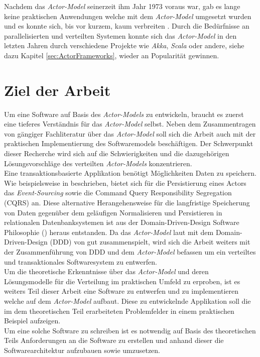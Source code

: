 % 
Nachdem das \textit{Actor-Model} seinerzeit ihm Jahr 1973 voraus war, gab es lange keine praktischen Anwendungen welche mit dem \textit{Actor-Model} umgesetzt wurden und es konnte sich, bis vor kurzem, kaum verbreiten \citep{mackay1997has}. Durch die Bedürfnisse an parallelisierten und verteilten Systemen konnte sich das \textit{Actor-Model} in den letzten Jahren durch verschiedene Projekte wie \textit{Akka}, \textit{Scala} oder andere, siehe dazu Kapitel \ref{sec:ActorFrameworks}, wieder an Popularität gewinnen. 
% 
% 

\section{Ziel der Arbeit}\label{sec:introduction:workGoal}
Um eine Software auf Basis des \textit{Actor-Models} zu entwickeln, braucht es zuerst eine tieferes Verständnis für das \textit{Actor-Model}  selbst.  Neben dem Zusammentragen  von gängiger Fachliteratur über das \textit{Actor-Model} soll sich die Arbeit auch mit der praktischen Implementierung des Softwaremodels beschäftigen. Der Schwerpunkt dieser Recherche wird sich auf die Schwierigkeiten und die dazugehörigen Lösungsvorschläge des verteilten \textit{Actor-Models}  konzentrieren. \\
Eine transaktionsbasierte Applikation benötigt Möglichkeiten Daten zu speichern. Wie beispielsweise in \cite{Vernon2015ReactiveAkka} beschrieben, bietet sich für die Persistierung eines Actors das \textit{Event-Sourcing} sowie die {Command Query Responsibility Segregation (CQRS)} an. Diese alternative Herangehensweise für die langfristige Speicherung von Daten gegenüber dem geläufigen Normalisieren und Persistieren in relationalen Datenbanksystemen ist aus der Domain-Driven-Design Software Philosophie (\cite{Evans2004Domain-drivenSoftware}) heraus  entstanden. Da das \textit{Actor-Model} laut \cite{Vernon2015ReactiveAkka} mit dem {Domain-Driven-Design} (DDD) von \citep{Evans2004Domain-drivenSoftware} gut zusammenspielt, wird sich die Arbeit weiters mit der Zusammenführung von DDD und dem \textit{Actor-Model}  befassen um ein verteiltes und transaktionales Softwaresystem zu entwerfen. \\ %
Um die theoretische Erkenntnisse über das \textit{Actor-Model}  und deren Lösungsmodelle für die Verteilung im praktischen Umfeld zu erproben, ist es weiters Teil dieser Arbeit eine Software zu entwerfen und zu implementieren welche auf dem \textit{Actor-Model} aufbaut. Diese zu entwickelnde Applikation soll die im dem theoretischen Teil erarbeiteten Problemfelder in einem praktischen Beispiel aufzeigen. \\
Um eine solche Software zu schreiben ist es notwendig auf Basis des theoretischen Teils Anforderungen an die Software zu erstellen und anhand dieser die Softwarearchitektur aufzubauen sowie umzusetzen. 

